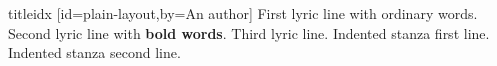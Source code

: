 \begin{ulSongs}{titleidx}
[id={plain-layout},by={An author}]
\beginverse
First lyric line with ordinary words.
Second lyric line with \textbf{bold words}.
Third lyric line.
\endverse
\beginverse*[1]
Indented stanza first line.
Indented stanza second line.
\endverse
\endsong
\end{ulSongs}
